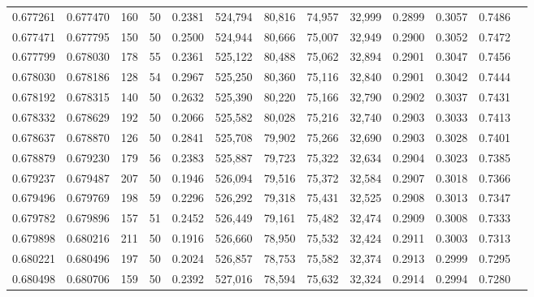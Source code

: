 \begin{tabular}{rrrrrrrrrrrrr}
0.677261 & 0.677470 &   160 &  50 &                                     0.2381 & 524,794 &  80,816 &  74,957 &  32,999 & 0.2899 & 0.3057 & 0.7486 \\
0.677471 & 0.677795 &   150 &  50 &                                     0.2500 & 524,944 &  80,666 &  75,007 &  32,949 & 0.2900 & 0.3052 & 0.7472 \\
0.677799 & 0.678030 &   178 &  55 &                                     0.2361 & 525,122 &  80,488 &  75,062 &  32,894 & 0.2901 & 0.3047 & 0.7456 \\
0.678030 & 0.678186 &   128 &  54 &                                     0.2967 & 525,250 &  80,360 &  75,116 &  32,840 & 0.2901 & 0.3042 & 0.7444 \\
0.678192 & 0.678315 &   140 &  50 &                                     0.2632 & 525,390 &  80,220 &  75,166 &  32,790 & 0.2902 & 0.3037 & 0.7431 \\
0.678332 & 0.678629 &   192 &  50 &                                     0.2066 & 525,582 &  80,028 &  75,216 &  32,740 & 0.2903 & 0.3033 & 0.7413 \\
0.678637 & 0.678870 &   126 &  50 &                                     0.2841 & 525,708 &  79,902 &  75,266 &  32,690 & 0.2903 & 0.3028 & 0.7401 \\
0.678879 & 0.679230 &   179 &  56 &                                     0.2383 & 525,887 &  79,723 &  75,322 &  32,634 & 0.2904 & 0.3023 & 0.7385 \\
0.679237 & 0.679487 &   207 &  50 &                                     0.1946 & 526,094 &  79,516 &  75,372 &  32,584 & 0.2907 & 0.3018 & 0.7366 \\
0.679496 & 0.679769 &   198 &  59 &                                     0.2296 & 526,292 &  79,318 &  75,431 &  32,525 & 0.2908 & 0.3013 & 0.7347 \\
0.679782 & 0.679896 &   157 &  51 &                                     0.2452 & 526,449 &  79,161 &  75,482 &  32,474 & 0.2909 & 0.3008 & 0.7333 \\
0.679898 & 0.680216 &   211 &  50 &                                     0.1916 & 526,660 &  78,950 &  75,532 &  32,424 & 0.2911 & 0.3003 & 0.7313 \\
0.680221 & 0.680496 &   197 &  50 &                                     0.2024 & 526,857 &  78,753 &  75,582 &  32,374 & 0.2913 & 0.2999 & 0.7295 \\
0.680498 & 0.680706 &   159 &  50 &                                     0.2392 & 527,016 &  78,594 &  75,632 &  32,324 & 0.2914 & 0.2994 & 0.7280 \\

\end{tabular}
